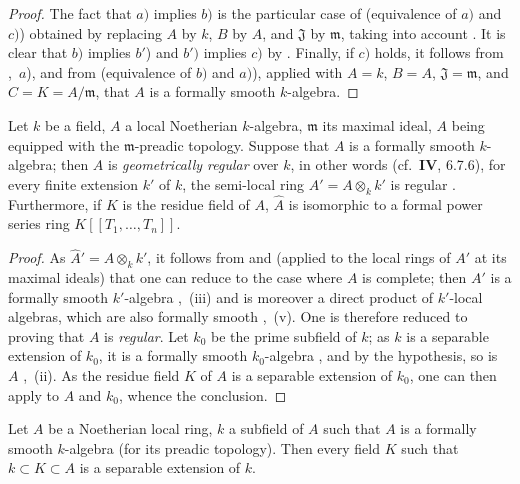 \begin{proof}
The fact that $a)$ implies $b)$ is the particular case of  (equivalence of $a)$ and $c)$) obtained by replacing $A$ by $k$, $B$ by $A$, and $\mathfrak{J}$ by $\mathfrak{m}$, taking into account .
It is clear that $b)$ implies $b'$) and $b')$ implies $c)$ by .
Finally, if $c)$ holds, it follows from ,~$a$), and from  (equivalence of $b)$ and $a)$), applied with $A=k$, $B=A$, $\mathfrak{J}=\mathfrak{m}$, and $C=K=A/\mathfrak{m}$, that $A$ is a formally smooth $k$-algebra.
\end{proof}

\begin{corollary}[19.6.5]
\label{0.19.6.5}
Let $k$ be a field, $A$ a local Noetherian $k$-algebra, $\mathfrak{m}$ its maximal ideal, $A$ being equipped with the $\mathfrak{m}$-preadic topology.
Suppose that $A$ is a formally smooth $k$-algebra;
then $A$ is \emph{geometrically regular} over $k$, in other words \textup{(cf.~$\mathbf{IV}$, 6.7.6)}, for every finite extension $k'$ of $k$, the semi-local ring $A'=A\otimes_k k'$ is regular .
Furthermore, if $K$ is the residue field of $A$, $\widehat{A}$ is isomorphic to a formal power series ring $K[[T_1,\ldots,T_n]]$.
\end{corollary}

\begin{proof}
As $\widehat{A}'=\widehat{A}\otimes_k k'$, it follows from  and  (applied to the local rings of $A'$ at its maximal ideals) that one can reduce to the case where $A$ is complete;
then $A'$ is a formally smooth $k'$-algebra ,~(iii) and is moreover a direct product of $k'$-local algebras, which are also formally smooth ,~(v).
One is therefore reduced to proving that $A$ is \emph{regular}.
Let $k_0$ be the prime subfield of $k$;
as $k$ is a separable extension of $k_0$, it is a formally smooth $k_0$-algebra , and by the hypothesis, so is $A$ ,~(ii).
As the residue field $K$ of $A$ is a separable extension of $k_0$, one can then apply  to $A$ and $k_0$, whence the conclusion.
\end{proof}


\begin{corollary}[19.6.5.1]
\label{0.19.6.5.1}
Let $A$ be a Noetherian local ring, $k$ a subfield of $A$ such that $A$ is a formally smooth $k$-algebra (for its preadic topology).
Then every field $K$ such that $k\subset K\subset A$ is a separable extension of $k$.
\end{corollary}

